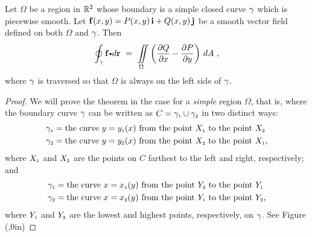   \begin{theorem}\label{thmGreens-simple}
  Let $\Omega$ be a region in $\mathbb{R}^2$ whose boundary is a simple closed curve $\gamma$ which is piecewise smooth.
  Let $\mathbf{ f}(x,y) = P(x,y)\,\mathbf{ i} + Q(x,y)\,\mathbf{ j}$ be a smooth vector field defined on both
  $\Omega$ and $\gamma$. Then
  \begin{equation}\label{eqn:green}
   \olineintvec{\caminho}{f}{r} ~=~ \iint\limits_{\Omega} \left( \frac{\partial Q}{\partial x} - \frac{\partial P}{\partial y} \right)
   \,dA ~,
  \end{equation}
  where $\gamma$ is traversed so that $\Omega$ is always on the left side of $\gamma$.
\end{theorem}
\begin{proof}
 We will prove the theorem in the case for a \emph{simple} region $\Omega$, that is, where the boundary curve $\gamma$ can be
 written as $C = \gamma_{\scriptscriptstyle 1} \cup \gamma_{\scriptscriptstyle 2}$ in two distinct ways:
 \begin{align}
  \gamma_{\scriptscriptstyle 1} &= \text{the curve $y = y_{\scriptscriptstyle 1}(x)$ from the point $X_{\scriptscriptstyle 1}$ to the point $X_{\scriptscriptstyle 2}$}\\
  \gamma_{\scriptscriptstyle 2} &= \text{the curve $y = y_{\scriptscriptstyle 2}(x)$ from the point $X_{\scriptscriptstyle 2}$ to the point $X_{\scriptscriptstyle 1}$,}
 \end{align}
 where $X_{\scriptscriptstyle 1}$ and $X_{\scriptscriptstyle 2}$ are the points on $C$ farthest to the left and right, respectively; and
 \begin{align}
  \gamma_{\scriptscriptstyle 1} &= \text{the curve $x = x_{\scriptscriptstyle 1}(y)$ from the point $Y_{\scriptscriptstyle 2}$ to the point $Y_{\scriptscriptstyle 1}$}\\
  \gamma_{\scriptscriptstyle 2} &= \text{the curve $x = x_{\scriptscriptstyle 2}(y)$ from the point $Y_{\scriptscriptstyle 1}$ to the point $Y_{\scriptscriptstyle 2}$,}
 \end{align}
 where $Y_{\scriptscriptstyle 1}$ and $Y_{\scriptscriptstyle 2}$ are the lowest and highest points, respectively, on $\gamma$.
 See Figure 
 \piccaption[]{}\parpic(\textwidth,0in){}
\end{proof}
